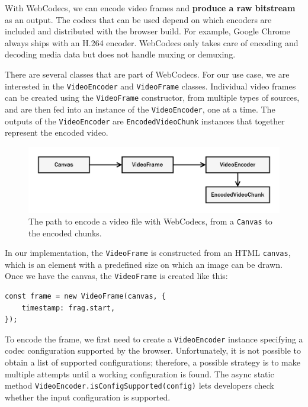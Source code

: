 With WebCodecs, we can encode video frames and \textbf{produce a raw bitstream} as an output. The codecs that can be used depend on which encoders are included and distributed with the browser build. For example, Google Chrome always ships with an H.264 encoder. WebCodecs only takes care of encoding and decoding media data but does not handle muxing or demuxing.

There are several classes that are part of WebCodecs. For our use case, we are interested in the \texttt{VideoEncoder} and \texttt{VideoFrame} classes. Individual video frames can be created using the \texttt{VideoFrame} constructor, from multiple types of sources, and are then fed into an instance of the \texttt{VideoEncoder}, one at a time. The outputs of the \texttt{VideoEncoder} are \texttt{EncodedVideoChunk} instances that together represent the encoded video.\cite{webcodecs}

\begin{figure}[h]
    \centering
    \includegraphics[width=\textwidth]{res/webcodecs.png}
    \caption{The path to encode a video file with WebCodecs, from a \texttt{Canvas} to the encoded chunks.}
    \label{fig:webcodecs_diagram}
\end{figure}

In our implementation, the \texttt{VideoFrame} is constructed from an HTML \texttt{canvas}, which is an element with a predefined size on which an image can be drawn. Once we have the canvas, the \texttt{VideoFrame} is created like this:

\begin{verbatim}
const frame = new VideoFrame(canvas, {
    timestamp: frag.start,
});
\end{verbatim}

To encode the frame, we first need to create a \texttt{VideoEncoder} instance specifying a codec configuration supported by the browser. Unfortunately, it is not possible to obtain a list of supported configurations; therefore, a possible strategy is to make multiple attempts until a working configuration is found. The async static method \texttt{VideoEncoder.isConfigSupported(config)} lets developers check whether the input configuration is supported.

